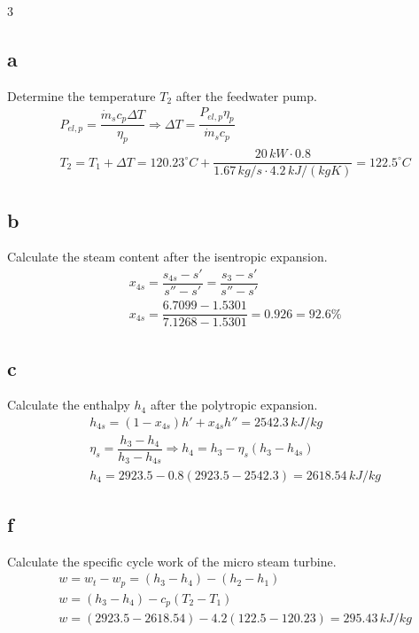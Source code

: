 \documentclass[9pt, landscape, a4paper]{article}
\begin{document}
\begin{multicols*}{3}
\subsection*{a}
Determine the temperature $T_2$ after the feedwater pump.
\begingroup
\scriptsize
\begin{align*}
  & P_{el,p}=\dfrac{\dot m_sc_p\Delta T}{\eta_p}
  \Longrightarrow
  \Delta T=\dfrac{P_{el,p}\eta_p}{\dot m_sc_p}\\[.8ex]
  & T_2=T_1+\Delta T
  =120.23^\circ C+
  \dfrac{20\,kW\cdot0.8}{1.67\,kg/s\cdot4.2\,kJ/(kgK)}
  =122.5^\circ C
\end{align*}
\endgroup

\subsection*{b}
Calculate the steam content after the isentropic expansion.
\begingroup
\scriptsize
\begin{align*}
  & x_{4s}=\dfrac{s_{4s}-s'}{s''-s'}
  =\dfrac{s_3-s'}{s''-s'}\\[.8ex]
  & x_{4s}
  =\dfrac{6.7099-1.5301}{7.1268-1.5301}
  =0.926=92.6\%
\end{align*}
\endgroup

\subsection*{c}
Calculate the enthalpy $h_4$ after the polytropic expansion.
\begingroup
\scriptsize
\begin{align*}
  & h_{4s}=(1-x_{4s})h'+x_{4s}h''
  =2542.3\,kJ/kg\\[.8ex]
  & \eta_s=\dfrac{h_3-h_4}{h_3-h_{4s}}
  \Longrightarrow
  h_4=h_3-\eta_s\left(h_3-h_{4s}\right)\\[.8ex]
  & h_4=2923.5-0.8\left(2923.5-2542.3\right)
  =2618.54\,kJ/kg
\end{align*}
\endgroup

\subsection*{f}
Calculate the specific cycle work of the micro steam turbine.
\begingroup
\scriptsize
\begin{align*}
  & w=w_t-w_p=\left(h_3-h_4\right)-\left(h_2-h_1\right)\\[.8ex]
  & w=\left(h_3-h_4\right)-c_p\left(T_2-T_1\right)\\[.8ex]
  & w=\left(2923.5-2618.54\right)-4.2\left(122.5-120.23\right)
  =295.43\,kJ/kg
\end{align*}
\endgroup


\end{multicols*}
\end{document}
